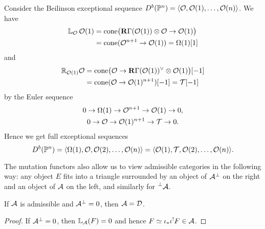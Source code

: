\begin{example}[label=ex:tangentbundle]{}{}
    Consider the Beilinson exceptional sequence
    $D^b(\mathbb{P}^n)=\langle\mathcal{O},\mathcal{O}(1),\ldots,\mathcal{O}(n)\rangle$. We have
    \begin{align*}
        \mathbb{L}_{\mathcal{O}}\,\mathcal{O}(1)
            &= \operatorname{cone}\bigl(\operatorname{\mathbf{R}\Gamma}(\mathcal{O}(1))\otimes\mathcal{O}\to\mathcal{O}(1)\bigr) \\
            &= \operatorname{cone}(\mathcal{O}^{n+1}\to\mathcal{O}(1))
            = \Omega(1)[1]
    \end{align*}
    and
    \begin{align*}
        \mathbb{R}_{\mathcal{O}(1)}\mathcal{O}
            &= \operatorname{cone}\bigl(\mathcal{O}\to\operatorname{\mathbf{R}\Gamma}(\mathcal{O}(1))^\vee\otimes\mathcal{O}(1)\bigr)[-1] \\
            &= \operatorname{cone}(\mathcal{O}\to\mathcal{O}(1)^{n+1})[-1]
            = \mathcal{T}[-1]
    \end{align*}
    by the Euler sequence
    \begin{gather*}
        0\to\Omega(1)\to\mathcal{O}^{n+1}\to\mathcal{O}(1)\to0, \\
        0\to\mathcal{O}\to\mathcal{O}(1)^{n+1}\to\mathcal{T}\to0.
    \end{gather*}
    Hence we get full exceptional sequences
    \begin{equation*}
        D^b(\mathbb{P}^n)
            = \langle\Omega(1),\mathcal{O},\mathcal{O}(2),\ldots,\mathcal{O}(n)\rangle
            = \langle\mathcal{O}(1),\mathcal{T},\mathcal{O}(2),\ldots,\mathcal{O}(n)\rangle.
    \end{equation*}
\end{example}

The mutation functors also allow us to view admissible categories in the following way: any object $E$ fits into a triangle surrounded by an object of $\mathcal{A}^\perp$ on the right and an object of $\mathcal{A}$ on the left, and similarly for $\prescript{\perp}{}{\mathcal{A}}$.

\begin{corollary}{}{}
    If $\mathcal{A}$ is admissible and $\mathcal{A}^\perp=0$, then $\mathcal{A}=\mathcal{D}$.
\end{corollary}

\begin{proof}
    If $\mathcal{A}^\perp=0$, then $\mathbb{L}_{\mathcal{A}}(F)=0$ and hence $F\simeq \iota_* \iota^! F\in \mathcal{A}$.
\end{proof}

